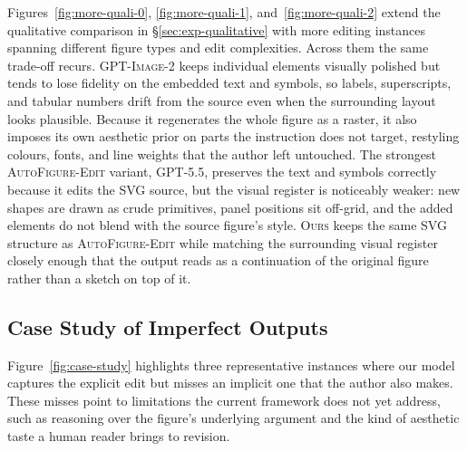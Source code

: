 \documentclass[11pt]{article}
\begin{document}
Figures~\ref{fig:more-quali-0}, \ref{fig:more-quali-1},
and~\ref{fig:more-quali-2} extend the qualitative comparison
in \S\ref{sec:exp-qualitative} with more editing instances
spanning different figure types and edit complexities.
Across them the same trade-off recurs.  \textsc{GPT-Image-2}
keeps individual elements visually polished but tends to lose
fidelity on the embedded text and symbols, so labels,
superscripts, and tabular numbers drift from the source even
when the surrounding layout looks plausible.  Because it
regenerates the whole figure as a raster, it also imposes its
own aesthetic prior on parts the instruction does not target,
restyling colours, fonts, and line weights that the author
left untouched.  The strongest
\textsc{AutoFigure-Edit} variant, \textsc{GPT-5.5}, preserves
the text and symbols correctly because it edits the SVG
source, but the visual register is noticeably weaker: new
shapes are drawn as crude primitives, panel positions sit
off-grid, and the added elements do not blend with the source
figure's style.  \textsc{Ours} keeps the same SVG structure
as \textsc{AutoFigure-Edit} while matching the surrounding
visual register closely enough that the output reads as a
continuation of the original figure rather than a sketch on
top of it.

\subsection{Case Study of Imperfect Outputs}
\label{sec:appendix-case-study}

Figure~\ref{fig:case-study} highlights three representative
instances where our model captures the explicit edit but
misses an implicit one that the author also makes.  These
misses point to limitations the current framework does not
yet address, such as reasoning over the figure's underlying
argument and the kind of aesthetic taste a human reader
brings to revision.
\end{document}
